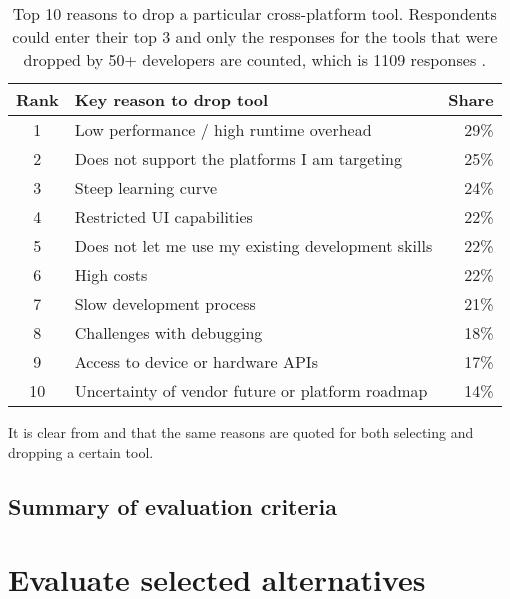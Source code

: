 \begin{table}[h]
    \begin{center}
        \begin{tabular}{clr}
            \hline
            Rank & Key reason to drop tool & Share \\
            \hline
            1  & Low performance / high runtime overhead & 29\% \\
            2  & Does not support the platforms I am targeting & 25\% \\
            3  & Steep learning curve & 24\% \\
            4  & Restricted UI capabilities & 22\% \\
            5  & Does not let me use my existing development skills & 22\% \\
            6  & High costs & 22\% \\
            7  & Slow development process & 21\% \\
            8  & Challenges with debugging & 18\% \\
            9  & Access to device or hardware APIs & 17\% \\
            10 & Uncertainty of vendor future or platform roadmap & 14\% \\
            \hline
        \end{tabular}
        \caption{Top 10 reasons to drop a particular cross-platform tool. Respondents could enter their top 3 and only the responses for the tools that were dropped by 50+ developers are counted, which is 1109 responses \cite{VMCPT:2012}.}
        \label{tab:drop}
    \end{center}
\end{table}

It is clear from  and  that the same reasons are quoted for both selecting and dropping a certain tool. 






\subsection{Summary of evaluation criteria}

\section{Evaluate selected alternatives}

